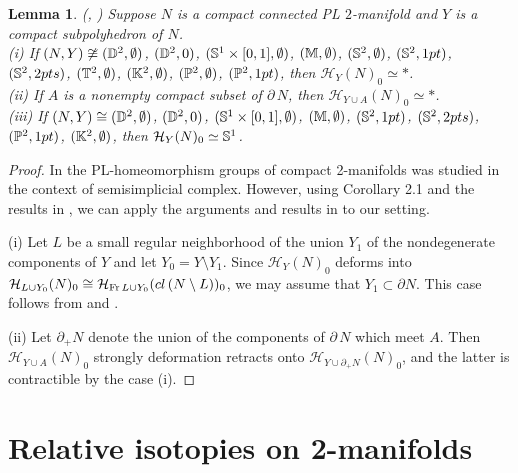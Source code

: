 \documentclass[11pt]{amsart}
\newtheorem{lemma}{Lemma}[section]
\theoremstyle{definition}
\newtheorem*{Proof of Theorem 3.1}{Proof of Theorem 3.1}
\newtheorem*{Proof of Corollary 3.1}{Proof of Corollary 3.1}
\newtheorem*{Proof of Proposition 4.1.(1)}{Proof of Proposition 4.1.(1)}
\newtheorem*{Proof of Proposition 4.1.(2)}{Proof of Proposition 4.1.(2)}
\newtheorem*{Proof of Corollary 1.1}{Proof of Corollary 1.1}
\def \cal {\mathcal}
\begin{document}
\begin{lemma} {\rm (}\cite{Ha}, \cite[\S3]{Sc}{\rm )} Suppose $N$ is a compact connected PL $2$-manifold and $Y$ is a compact subpolyhedron of $N$. \\
{\rm (i)} If $(N, Y) \not\cong ({\Bbb D}^2, \emptyset)$, $({\Bbb D}^2, 0)$, $({\Bbb S}^1 \times [0,1], \emptyset)$, $({\Bbb M}, \emptyset)$, $({\Bbb S}^2, \emptyset)$, $({\Bbb S}^2, 1pt)$, $({\Bbb S}^2, 2pts)$, $({\Bbb T}^2, \emptyset)$, $({\Bbb K}^2, \emptyset)$, $({\Bbb P}^2, \emptyset)$, $({\Bbb P}^2, 1pt)$, then ${\cal H}_Y(N)_0 \simeq \ast$. \\
{\rm (ii)} If $A$ is a nonempty compact subset of $\partial \, N$, then ${\cal H}_{Y \cup A}(N)_0 \simeq \ast$. \\
{\rm (iii)} If $(N, Y) \cong ({\Bbb D}^2, \emptyset)$, $({\Bbb D}^2, 0)$, $({\Bbb S}^1 \times [0,1], \emptyset)$, $({\Bbb M}, \emptyset)$, $({\Bbb S}^2, 1pt)$, $({\Bbb S}^2, 2pts)$, $({\Bbb P}^2, 1pt)$, $({\Bbb K}^2, \emptyset)$, then ${\cal H}_Y(N)_0 \simeq {\Bbb S}^1$. 
\end{lemma}

\begin{proof}
In \cite{Sc} the PL-homeomorphism groups of compact 2-manifolds was studied in the context of semisimplicial complex. However, using Corollary 2.1 and the results in \cite{Ha}, we can apply the arguments and results in \cite[\S3]{Sc} to our setting. 

(i) Let $L$ be a small regular neighborhood of the union $Y_1$ of the nondegenerate components of $Y$ and let $Y_0 = Y \setminus Y_1$. Since ${\cal H}_Y(N)_0$ deforms into ${\cal H}_{L \cup Y_0}(N)_0 \cong {\cal H}_{{\rm Fr} \, L \cup Y_0}(cl \, (N \setminus L))_0$, we may assume that $Y_1 \subset \partial N$. This case follows from \cite{Ha} and \cite[\S3]{Sc}. 

(ii) Let $\partial_+ N$ denote the union of the components of $\partial \, N$ which meet $A$. Then ${\cal H}_{Y \cup A}(N)_0$ strongly deformation retracts onto ${\cal H}_{Y \cup \partial_+ N}(N)_0$, and the latter is contractible by the case (i).  
\end{proof}

\section{Relative isotopies on 2-manifolds} 
\end{document}

